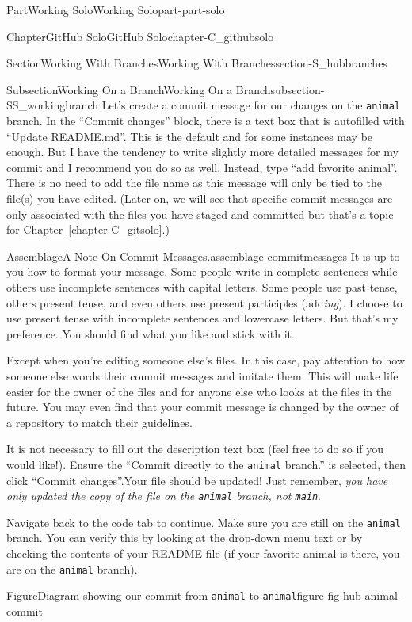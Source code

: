\documentclass[oneside,10pt,]{book}
\newcommand{\xreffont}{\relax}
\newcommand{\mono}[1]{\texttt{#1}}
\begin{document}
\begin{partptx}{Part}{Working Solo}{}{Working Solo}{}{}{part-part-solo}
\begin{chapterptx}{Chapter}{GitHub Solo}{}{GitHub Solo}{}{}{chapter-C_githubsolo}
\begin{sectionptx}{Section}{Working With Branches}{}{Working With Branches}{}{}{section-S_hubbranches}
\begin{subsectionptx}{Subsection}{Working On a Branch}{}{Working On a Branch}{}{}{subsection-SS_workingbranch}
Let's create a commit message for our changes on the \mono{animal} branch. In the ``Commit changes'' block, there is a text box that is autofilled with ``Update README.md''. This is the default and for some instances may be enough. But I have the tendency to write slightly more detailed messages for my commit and I recommend you do so as well. Instead, type ``add favorite animal''. There is no need to add the file name as this message will only be tied to the file(s) you have edited. (Later on, we will see that specific commit messages are only associated with the files you have staged and committed but that's a topic for \hyperref[chapter-C_gitsolo]{Chapter~{\xreffont\ref{chapter-C_gitsolo}}}.)%
\begin{assemblage}{Assemblage}{A Note On Commit Messages.}{assemblage-commitmessages}%
It is up to you how to format your message. Some people write in complete sentences while others use incomplete sentences with capital letters. Some people use past tense, others present tense, and even others use present participles (add\emph{ing}). I choose to use present tense with incomplete sentences and lowercase letters. But that's my preference. You should find what you like and stick with it.%
\par
\textellipsis{}Except when you're editing someone else's files. In this case, pay attention to how someone else words their commit messages and imitate them. This will make life easier for the owner of the files and for anyone else who looks at the files in the future. You may even find that your commit message is changed by the owner of a repository to match their guidelines.%
\end{assemblage}
It is not necessary to fill out the description text box (feel free to do so if you would like!). Ensure the ``Commit directly to the \mono{animal} branch.'' is selected, then click ``Commit changes''.Your file should be updated! Just remember, \emph{you have only updated the copy of the file on the \mono{animal} branch, not \mono{main}}.%
\par
Navigate back to the code tab to continue. Make sure you are still on the \mono{animal} branch. You can verify this by looking at the drop-down menu text or by checking the contents of your README file (if your favorite animal is there, you are on the \mono{animal} branch).%
\begin{figureptx}{Figure}{Diagram showing our commit from \mono{animal} to \mono{animal}}{figure-fig-hub-animal-commit}{}%
\begin{image}{0.05}{0.9}{0.05}{}%

\end{image}
\end{figureptx}
\end{subsectionptx}
\end{sectionptx}
\end{chapterptx}
\end{partptx}
\end{document}
